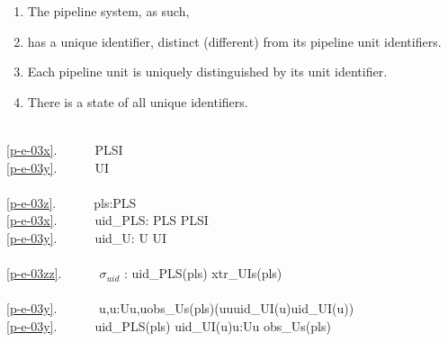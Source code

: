 \begin{enumerate}\setei
\item \label{p-e-03z} The pipeline system, as such,
\item \label{p-e-03x} has a unique identifier, distinct (different) from its
                      pipeline unit identifiers. 
\item \label{p-e-03y} Each pipeline unit is uniquely distinguished by
                      its unit identifier. 
\item \label{p-e-03zz} There is a state of all unique identifiers.
\savei\end{enumerate}
\mnewfoil
\bp
\>\ \\
\ref{p-e-03x}.\ \ \ \ \ \ PLSI \\
\ref{p-e-03y}.\ \ \ \ \ \ UI \\
\>\ \\
\ref{p-e-03z}.\ \ \ \ \ \ pls:PLS\\
\ref{p-e-03x}.\ \ \ \ \ \ uid\_PLS: PLS {\RIGHTARROW} PLSI\\
\ref{p-e-03y}.\ \ \ \ \ \ uid\_U: U {\RIGHTARROW} UI\\
\>\ \\
\ref{p-e-03zz}.\ \ \ \ \ \ $\sigma$$_{uid}$ :{\EQ} {\LBRACE} uid\_PLS(pls) {\RBRACE} {\UNION} xtr\_UIs(pls) \\
\>\  \\
\ref{p-e-03y}.\ \ \ \ \ \ {\ALL} u,u{\PRIM}:U{\RDOT}{\LBRACE}u,u{\PRIM}{\RBRACE}{\SUBSETEQ}obs\_Us(pls){\DBLRIGHTARROW}(u{\NOTEQ}u{\PRIM}{\DBLRIGHTARROW}uid\_UI(u){\NOTEQ}uid\_UI(u{\PRIM}))\\
\ref{p-e-03y}.\ \ \ \ {\WEDGE}\ \ uid\_PLS(pls) {\NOTISIN} {\LBRACE}uid\_UI(u){\BAR}u:U{\RDOT}u {\ISIN} obs\_Us(pls){\RBRACE}
\ep

